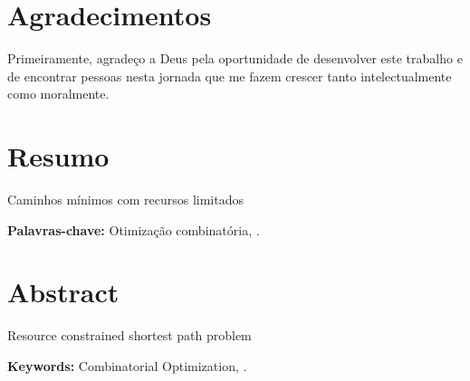 \documentclass[12pt,twoside,a4paper]{book}
\begin{document}
      



\chapter*{Agradecimentos}

Primeiramente, agradeço a Deus pela oportunidade de desenvolver este trabalho
e de encontrar pessoas nesta jornada que me fazem crescer tanto intelectualmente
como moralmente.


\chapter*{Resumo}

\begin{center}
  \Large{Caminhos mínimos com recursos limitados}
\end{center}

\noindent \textbf{Palavras-chave:} Otimização combinatória, .

\chapter*{Abstract}

\begin{center}
  \Large{Resource constrained shortest path problem}
\end{center}

\noindent \textbf{Keywords:} Combinatorial Optimization, .

\tableofcontents    %
\end{document}
